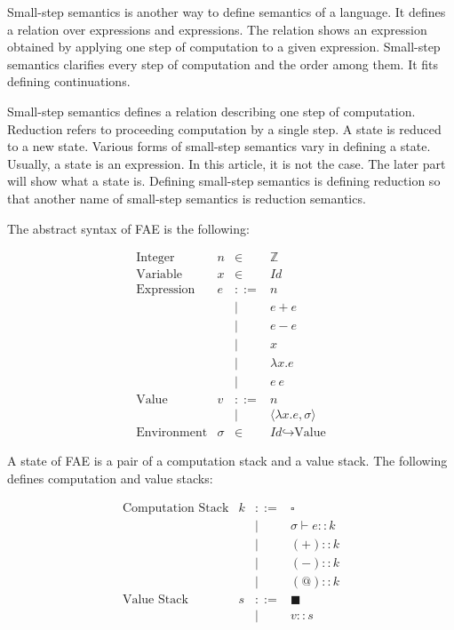 Small-step semantics is another way to define semantics of a language. It defines
a relation over expressions and expressions. The relation shows an expression
obtained by applying one step of computation to a given expression. Small-step
semantics clarifies every step of computation and the order among them. It fits
defining continuations.

Small-step semantics defines a relation describing one step of computation.
Reduction refers to proceeding computation by a single step. A state is reduced
to a new state. Various forms of small-step semantics vary in defining a state.
Usually, a state is an expression. In this article, it is not the case. The later
part will show what a state is. Defining small-step semantics is defining
reduction so that another name of small-step semantics is reduction semantics.

The abstract syntax of FAE is the following:

\[
\begin{array}{lrcl}
\text{Integer} & n & \in & \mathbb{Z} \\
\text{Variable} & x & \in & \textit{Id} \\
\text{Expression} & e & ::= & n \\
&& | & e + e \\
&& | & e - e \\
&& | & x \\
&& | & \lambda x.e \\
&& | & e\ e \\
\text{Value} & v & ::= & n \\
&& | & \langle\lambda x.e,\sigma\rangle \\
\text{Environment} & \sigma & \in &
\textit{Id} \hookrightarrow \text{Value}
\end{array}
\]

A state of FAE is a pair of a computation stack and a value stack. The following
defines computation and value stacks:

\[
\begin{array}{lrcl}
\text{Computation Stack} & k & ::= & \square \\
&& | & \sigma\vdash e::k \\
&& | & (+)::k \\
&& | & (-)::k \\
&& | & (@)::k \\
\text{Value Stack} & s & ::= & \blacksquare \\
&& | & v::s
\end{array}
\]


